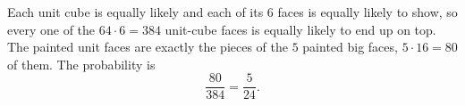 Each unit cube is equally likely and each of its $6$ faces is equally likely to show, so every one of the $64\cdot6=384$ unit-cube faces is equally likely to end up on top. The painted unit faces are exactly the pieces of the $5$ painted big faces, $5\cdot16=80$ of them. The probability is
\[
\dfrac{80}{384}=\boxed{\dfrac{5}{24}}.
\]
